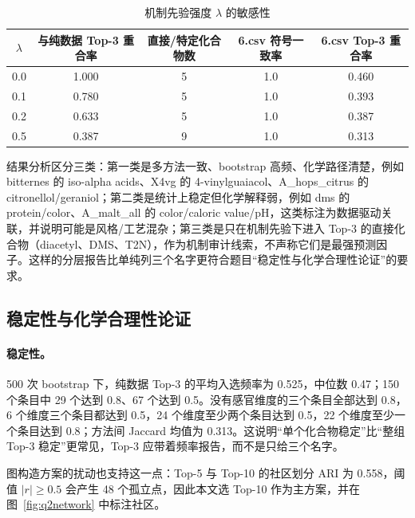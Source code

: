 \begin{table}[htbp]
  \centering
  \caption{机制先验强度 $\lambda$ 的敏感性}
  \label{tab:q2-domain-sensitivity}
  \footnotesize
  \setlength{\tabcolsep}{3pt}
  \begin{tabular}{@{}c c c c c@{}}
    \toprule
    $\lambda$ & 与纯数据 Top-3 重合率 & 直接/特定化合物数 & 6.csv 符号一致率 & 6.csv Top-3 重合率 \\
    \midrule
    0.0 & 1.000 & 5 & 1.0 & 0.460 \\
    0.1 & 0.780 & 5 & 1.0 & 0.393 \\
    0.2 & 0.633 & 5 & 1.0 & 0.387 \\
    0.5 & 0.387 & 9 & 1.0 & 0.313 \\
    \bottomrule
  \end{tabular}
\end{table}

结果分析区分三类：第一类是多方法一致、bootstrap 高频、化学路径清楚，例如 bitternes 的 iso-alpha acids、X4vg 的 4-vinylguaiacol、A\_hops\_citrus 的 citronellol/geraniol；第二类是统计上稳定但化学解释弱，例如 dms 的 protein/color、A\_malt\_all 的 color/caloric value/pH，这类标注为数据驱动关联，并说明可能是风格/工艺混杂；第三类是只在机制先验下进入 Top-3 的直接化合物（diacetyl、DMS、T2N），作为机制审计线索，不声称它们是最强预测因子。这样的分层报告比单纯列三个名字更符合题目“稳定性与化学合理性论证”的要求。

\subsection{稳定性与化学合理性论证}

\paragraph{稳定性。}500 次 bootstrap 下，纯数据 Top-3 的平均入选频率为 0.525，中位数 0.47；150 个条目中 29 个达到 0.8、67 个达到 0.5。没有感官维度的三个条目全部达到 0.8，6 个维度三个条目都达到 0.5，24 个维度至少两个条目达到 0.5，22 个维度至少一个条目达到 0.8；方法间 Jaccard 均值为 0.313。这说明“单个化合物稳定”比“整组 Top-3 稳定”更常见，Top-3 应带着频率报告，而不是只给三个名字。



图构造方案的扰动也支持这一点：Top-5 与 Top-10 的社区划分 ARI 为 0.558，阈值 $|r|\ge0.5$ 会产生 48 个孤立点，因此本文选 Top-10 作为主方案，并在图~\ref{fig:q2network} 中标注社区。

